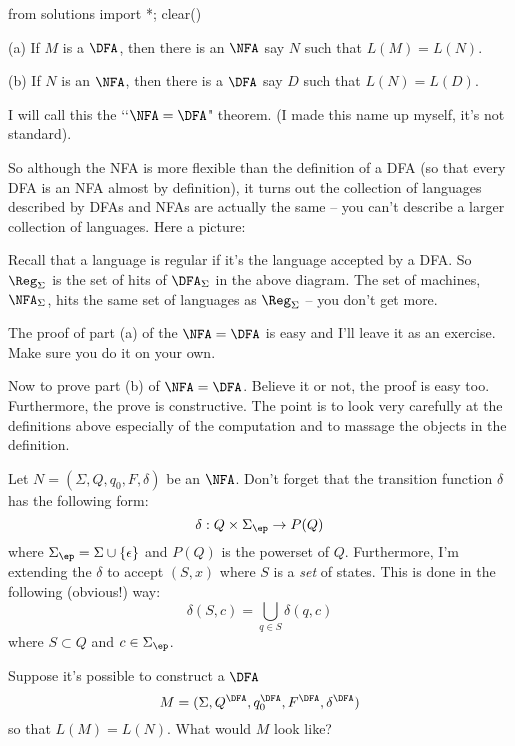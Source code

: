 \begin{python0}
  from solutions import *; clear()
\end{python0}

\begin{thm} \mbox{}
 \begin{tightlist}
 \item[(a)] If $M$ is a $\DFA$, then there is an $\NFA$ say $N$ such
  that $L(M) = L(N)$.
 \item[(b)] If $N$ is an $\NFA$, then there is a $\DFA$ say $D$ such
 that $L(N) = L(D)$.
 \end{tightlist}
\end{thm}

I will call this the \lq\lq $\NFA = \DFA$" theorem. (I made this name up
myself, it's not standard).

So although the NFA is more flexible than the definition of a DFA
(so that every DFA is an NFA almost by definition),
it turns out the collection of languages described by DFAs and NFAs
are actually the same -- you can't describe a larger collection of languages.
Here a picture:



Recall that a language is regular if it's the language
accepted by a DFA.
So $\Reg_\Sigma$ is the set of hits of $\DFA_\Sigma$ in the above diagram.
The set of machines, $\NFA_\Sigma$, hits
the same set of languages as $\Reg_\Sigma$ -- you don't get more.

The proof of part (a) of the $\NFA=\DFA$ is easy and I'll leave it as an
exercise. Make sure you do it on your own.

Now to prove part (b) of $\NFA=\DFA$. Believe it or not, the proof is
easy too. Furthermore, the prove is constructive. The point is to
look very carefully at the definitions above especially of the
computation and to massage the objects in the definition.

Let $N = (\Sigma,Q,q_0,F,\delta)$ be an $\NFA$. 
Don't forget that the transition function $\delta$ has the following form:
\[
\delta: Q \times \Sigma_\ep \rightarrow P(Q)
\] 
where $\Sigma_\ep = \Sigma \cup \{\epsilon\}$ and $P(Q)$ is the 
powerset of $Q$.
Furthermore, I'm extending the $\delta$ to accept $(S, x)$
where $S$ is a \textit{set} of states.
This is done in the following (obvious!) way:
\[
\delta(S, c) = \bigcup_{q \in S} \delta(q, c)
\]
where $S \subset Q$ and $c \in \Sigma_\ep$.

Suppose it's possible
to construct a $\DFA$ 
\[
M = (\Sigma,Q^{\DFA}, q_0^{\DFA}, F^{\DFA}, \delta^{\DFA})
\]
so that $L(M) = L(N)$. What would $M$ look like?

